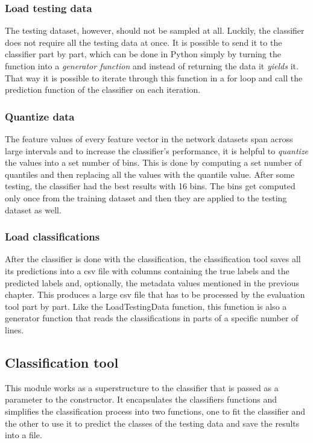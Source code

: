 \documentclass{article}
\begin{document}
      \subsubsection{Load testing data}
        The testing dataset, however, should not be sampled at all. Luckily, the classifier does not require all the testing data at once. It is possible to send it to the classifier part by part, which can be done in Python simply by turning the function into a {\it generator function} and instead of returning the data it {\it yields} it. That way it is possible to iterate through this function in a for loop and call the prediction function of the classifier on each iteration.
      \subsubsection{Quantize data}
        The feature values of every feature vector in the network datasets span across large intervals and to increase the classifier's performance, it is helpful to {\it quantize} the values into a set number of bins. This is done by computing a set number of quantiles and then replacing all the values with the quantile value. After some testing, the classifier had the best results with 16 bins. The bins get computed only once from the training dataset and then they are applied to the testing dataset as well.
      \subsubsection{Load classifications}
        After the classifier is done with the classification, the classification tool saves all its predictions into a csv file with columns containing the true labels and the predicted labels and, optionally, the metadata values mentioned in the previous chapter. This produces a large csv file that has to be processed by the evaluation tool part by part. Like the LoadTestingData function, this function is also a generator function that reads the classifications in parts of a specific number of lines.
    \newpage
    \subsection{Classification tool}
      This module works as a superstructure to the classifier that is passed as a parameter to the constructor. It encapsulates the classifiers functions and simplifies the classification process into two functions, one to fit the classifier and the other to use it to predict the classes of the testing data and save the results into a file.
\end{document}
